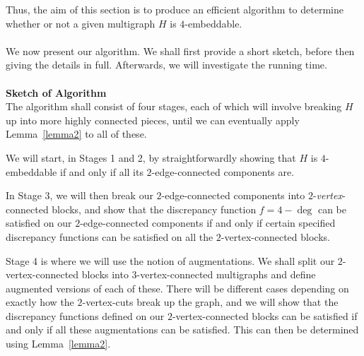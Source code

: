 \documentclass{article}
\newtheorem{Proof of Theorem}{Proof of Theorem}
\begin{document}
Thus, the aim of this section is to produce an efficient algorithm to determine whether or not
a given multigraph $H$ is $4$-embeddable. \\
\\




















































We now present our algorithm. 
We shall first provide a short sketch,
before then giving the details in full.
Afterwards,
we will investigate $\textrm{the running time}$. \\
\\
\textbf{Sketch of Algorithm} \\
The algorithm shall consist of four stages,
each of which will involve breaking $H$ up into more highly connected pieces,
until we can eventually apply Lemma~\ref{lemma2} to all of these.

We will start,
in Stages 1 and 2,
by straightforwardly showing that $H$ is $4$-embeddable
if and only if all its $2$-edge-connected components are.

In Stage 3, 
we will then break our $2$-edge-connected components into $2$-\textit{vertex}-connected blocks,
and show that the discrepancy function $f=4-\deg$ can be satisfied on our $2$-edge-connected components
if and only if certain specified discrepancy functions can be satisfied on all the $2$-vertex-connected blocks.

Stage 4 is where we will use the notion of augmentations.
We shall split our $2$-vertex-connected blocks into $3$-vertex-connected multigraphs
and define augmented versions of each of these.
There will be different cases depending on exactly how the $2$-vertex-cuts break up the graph,
and we will show that the discrepancy functions defined on our $2$-vertex-connected blocks can be satisfied
if and only if all these augmentations can be satisfied.
This can then be determined using Lemma~\ref{lemma2}. 
\end{document}
